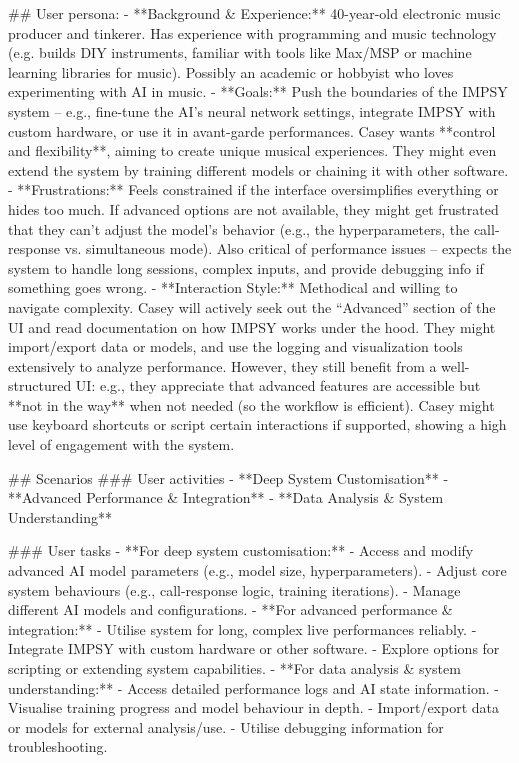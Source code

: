## User persona:
- **Background & Experience:** 40-year-old electronic music producer and tinkerer. Has experience with programming and music technology (e.g. builds DIY instruments, familiar with tools like Max/MSP or machine learning libraries for music). Possibly an academic or hobbyist who loves experimenting with AI in music.
- **Goals:** Push the boundaries of the IMPSY system – e.g., fine-tune the AI’s neural network settings, integrate IMPSY with custom hardware, or use it in avant-garde performances. Casey wants **control and flexibility**, aiming to create unique musical experiences. They might even extend the system by training different models or chaining it with other software.
- **Frustrations:** Feels constrained if the interface oversimplifies everything or hides too much. If advanced options are not available, they might get frustrated that they can’t adjust the model’s behavior (e.g., the hyperparameters, the call-response vs. simultaneous mode). Also critical of performance issues – expects the system to handle long sessions, complex inputs, and provide debugging info if something goes wrong.
- **Interaction Style:** Methodical and willing to navigate complexity. Casey will actively seek out the “Advanced” section of the UI and read documentation on how IMPSY works under the hood. They might import/export data or models, and use the logging and visualization tools extensively to analyze performance. However, they still benefit from a well-structured UI: e.g., they appreciate that advanced features are accessible but **not in the way** when not needed (so the workflow is efficient). Casey might use keyboard shortcuts or script certain interactions if supported, showing a high level of engagement with the system.

## Scenarios
###  User activities
- **Deep System Customisation**
- **Advanced Performance & Integration**
- **Data Analysis & System Understanding**

###  User tasks
- **For deep system customisation:**
    -   Access and modify advanced AI model parameters (e.g., model size, hyperparameters).
    -   Adjust core system behaviours (e.g., call-response logic, training iterations).
    -   Manage different AI models and configurations.
- **For advanced performance & integration:**
    -   Utilise system for long, complex live performances reliably.
    -   Integrate IMPSY with custom hardware or other software.
    -   Explore options for scripting or extending system capabilities.
- **For data analysis & system understanding:**
    -   Access detailed performance logs and AI state information.
    -   Visualise training progress and model behaviour in depth.
    -   Import/export data or models for external analysis/use.
    -   Utilise debugging information for troubleshooting.

